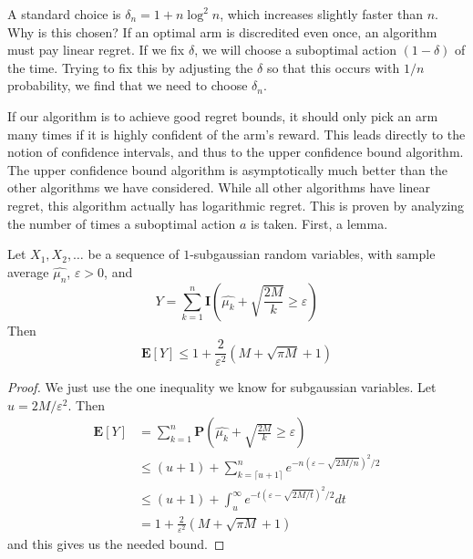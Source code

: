 A standard choice is $\delta_n = 1 + n \log^2 n$, which increases slightly faster than $n$. Why is this chosen? If an optimal arm is discredited even once, an algorithm must pay linear regret. If we fix $\delta$, we will choose a suboptimal action $(1 - \delta)$ of the time. Trying to fix this by adjusting the $\delta$ so that this occurs with $1/n$ probability, we find that we need to choose $\delta_n$.

If our algorithm is to achieve good regret bounds, it should only pick an arm many times if it is highly confident of the arm's reward. This leads directly to the notion of confidence intervals, and thus to the upper confidence bound algorithm. The upper confidence bound algorithm is asymptotically much better than the other algorithms we have considered. While all other algorithms have linear regret, this algorithm actually has logarithmic regret. This is proven by analyzing the number of times a suboptimal action $a$ is taken. First, a lemma.

\begin{lemma}
    Let $X_1, X_2, \dots$ be a sequence of $1$-subgaussian random variables, with sample average $\widehat{\mu_n}$, $\varepsilon > 0$, and
    \[ Y = \sum_{k = 1}^n \mathbf{I} \left(\widehat{\mu_k} + \sqrt{\frac{2M}{k}} \geq \varepsilon \right) \]
    Then
    \[ \mathbf{E}[Y] \leq 1 + \frac{2}{\varepsilon^2} \left(M + \sqrt{\pi M} + 1 \right) \]
\end{lemma}
\begin{proof}
    We just use the one inequality we know for subgaussian variables. Let $u = 2M/\varepsilon^2$. Then
    \begin{align*}
        \mathbf{E}[Y] &= \sum_{k = 1}^n \mathbf{P} \left(\widehat{\mu_k} + \sqrt{\frac{2 M}{k}} \geq \varepsilon \right)\\
        &\leq (u+1) + \sum_{k = \lceil u + 1 \rceil}^n e^{-n(\varepsilon - \sqrt{2M/n})^2/2}\\
        &\leq (u+1) + \int_u^\infty e^{-t(\varepsilon - \sqrt{2M/t})^2/2} dt\\
        &= 1 + \frac{2}{\varepsilon^2}(M + \sqrt{\pi M} + 1)
    \end{align*}
    and this gives us the needed bound.
\end{proof}

